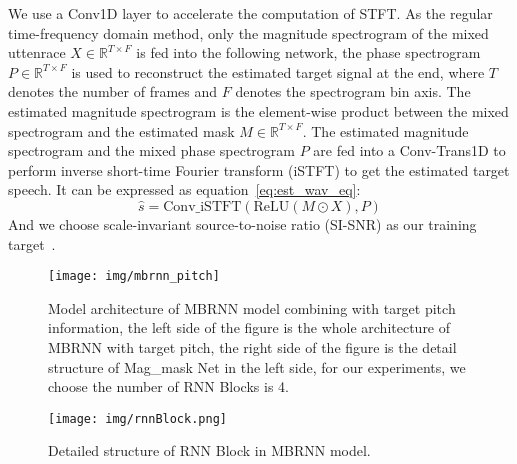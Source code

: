 We use a Conv1D layer to accelerate the computation of STFT.
As the regular time-frequency domain method, only the magnitude spectrogram of the mixed uttenrace $X\in\mathbb{R}^{T\times F}$ is fed into the following network, the phase spectrogram $P\in\mathbb{R}^{T\times F}$ is used to reconstruct the estimated target signal at the end, where $T$ denotes the number of frames and $F$ denotes the spectrogram bin axis.
The estimated magnitude spectrogram is the element-wise product between the mixed spectrogram and the estimated mask $M\in\mathbb{R}^{T\times F}$. The estimated magnitude spectrogram and the mixed phase spectrogram $P$ are fed into a Conv-Trans1D to perform inverse short-time Fourier transform (iSTFT) to get the estimated target speech.
It can be expressed as equation~\ref{eq:est_wav_eq}:
\begin{equation}
    \label{eq:est_wav_eq}
    \hat{s} = \text{Conv\_iSTFT}\left( \text{ReLU}\left( M\odot X \right), P \right)
\end{equation}
And we choose scale-invariant source-to-noise ratio (SI-SNR) as our training target~\cite{tasnet}.

\begin{figure}[t]
    \centering
    \texttt{[image: img/mbrnn\_pitch]}
    \caption{Model architecture of MBRNN model combining with target pitch information, the left side of the figure is the whole architecture of MBRNN with target pitch, the right side of the figure is the detail structure of Mag\_mask Net in the left side, for our experiments, we choose the number of RNN Blocks is 4.}
    \label{fig:mbrnn_pitch}
\end{figure}

\begin{figure}[t]
    \centering
    \texttt{[image: img/rnnBlock.png]}
    \caption{Detailed structure of RNN Block in MBRNN model.}
    \label{fig:rnnBlock}
\end{figure}

